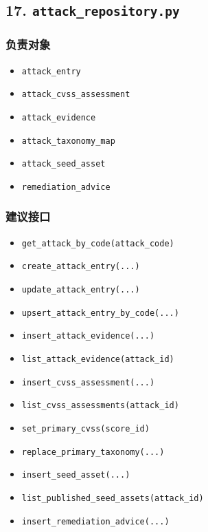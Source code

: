 \documentclass[UTF8]{ctexart}
\providecommand{\tightlist}{%
  \setlength{\itemsep}{0pt}\setlength{\parskip}{0pt}}
\begin{document}
\hypertarget{attack_repository.py}{%
\subsection{\texorpdfstring{17.
\texttt{attack\_repository.py}}{17. attack\_repository.py}}\label{attack_repository.py}}

\hypertarget{ux8d1fux8d23ux5bf9ux8c61-1}{%
\subsubsection{负责对象}\label{ux8d1fux8d23ux5bf9ux8c61-1}}

\begin{itemize}
\tightlist
\item
  \texttt{attack\_entry}
\item
  \texttt{attack\_cvss\_assessment}
\item
  \texttt{attack\_evidence}
\item
  \texttt{attack\_taxonomy\_map}
\item
  \texttt{attack\_seed\_asset}
\item
  \texttt{remediation\_advice}
\end{itemize}

\hypertarget{ux5efaux8baeux63a5ux53e3-1}{%
\subsubsection{建议接口}\label{ux5efaux8baeux63a5ux53e3-1}}

\begin{itemize}
\tightlist
\item
  \texttt{get\_attack\_by\_code(attack\_code)}
\item
  \texttt{create\_attack\_entry(...)}
\item
  \texttt{update\_attack\_entry(...)}
\item
  \texttt{upsert\_attack\_entry\_by\_code(...)}
\item
  \texttt{insert\_attack\_evidence(...)}
\item
  \texttt{list\_attack\_evidence(attack\_id)}
\item
  \texttt{insert\_cvss\_assessment(...)}
\item
  \texttt{list\_cvss\_assessments(attack\_id)}
\item
  \texttt{set\_primary\_cvss(score\_id)}
\item
  \texttt{replace\_primary\_taxonomy(...)}
\item
  \texttt{insert\_seed\_asset(...)}
\item
  \texttt{list\_published\_seed\_assets(attack\_id)}
\item
  \texttt{insert\_remediation\_advice(...)}
\end{itemize}
\end{document}
